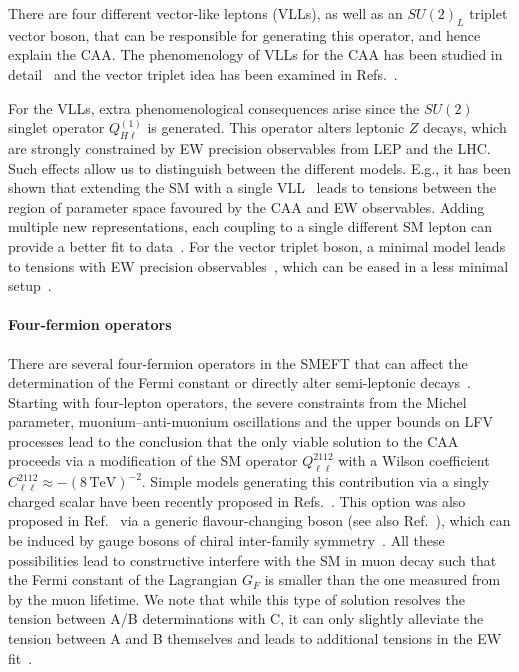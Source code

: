 \documentclass[10pt]{article}
\begin{document}
There are four different vector-like leptons (VLLs), as well as an \(SU(2)_L\) triplet vector boson, that can be responsible for generating this operator, and hence explain the CAA.
The phenomenology of VLLs for the CAA has been studied in detail~\cite{Endo:2020tkb,Crivellin:2020ebi,Kirk:2020wdk,Manzari:2021prf}
and the vector triplet idea has been examined in Refs.~\cite{Kirk:2020wdk,Capdevila:2020rrl}.

For the VLLs, extra phenomenological consequences arise since the \(SU(2)\) singlet operator \(Q_{H\ell}^{(1)}\) is generated. This operator alters leptonic \(Z\) decays, which are strongly constrained by EW precision observables from LEP and the LHC. Such effects allow us to distinguish between the different models. E.g., it has been shown that extending the SM with a single VLL~\cite{Kirk:2020wdk,Alok:2020jod} leads to tensions between the region of parameter space favoured by the CAA and EW observables. Adding multiple new representations, each coupling to a single different SM lepton can provide a better fit to data~\cite{Crivellin:2020ebi}. For the vector triplet boson, a minimal model leads to tensions with EW precision observables~\cite{Kirk:2020wdk}, which can be eased in a less minimal setup~\cite{Capdevila:2020rrl}.

\paragraph{Four-fermion operators}
%
There are several four-fermion operators in the SMEFT that can affect the determination of the Fermi constant or directly alter semi-leptonic decays~\cite{Crivellin:2021njn}. Starting with four-lepton operators, the severe constraints from the Michel parameter, muonium--anti-muonium oscillations and the upper bounds on LFV processes lead to the conclusion that the only viable solution to the CAA proceeds via a modification of the SM operator \(Q_{\ell\ell}^{2112}\) with a Wilson coefficient \(C_{\ell\ell}^{2112} \approx -(8\,\text{TeV})^{-2}\).
Simple models generating this contribution via a singly charged scalar have been recently proposed in Refs.~\cite{Crivellin:2020oup,Crivellin:2020klg,Marzocca:2021azj}. This option was also proposed in Ref.~\cite{Belfatto:2019swo} via a generic flavour-changing boson (see also Ref.~\cite{Buras:2021btx}), which can be induced by gauge bosons of chiral inter-family symmetry~\cite{Berezhiani:1983rk,Berezhiani:1990wn}.
All these possibilities lead to constructive interfere with the SM in muon decay such that the Fermi constant of the Lagrangian \(G_F\) is smaller than the one measured from by the muon lifetime. We note that while this type of solution resolves the tension between A/B determinations with C, it can only slightly alleviate the tension between A and B themselves and leads to additional tensions in the EW fit~\cite{Crivellin:2021njn}.
\end{document}
